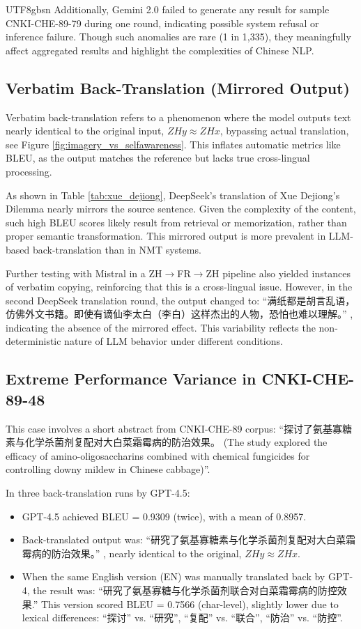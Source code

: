 \documentclass[conference]{IEEEtran}
\begin{document}
\begin{CJK}{UTF8}{gbsn}
Additionally, Gemini 2.0 failed to generate any result for sample CNKI-CHE-89-79 during one round, indicating possible system refusal or inference failure. Though such anomalies are rare (1 in 1,335), they meaningfully affect aggregated results and highlight the complexities of Chinese NLP.

\subsection{Verbatim Back-Translation (Mirrored Output)}
Verbatim back-translation refers to a phenomenon where the model outputs text nearly identical to the original input, $ZHy \approx ZHx$, bypassing actual translation, see Figure \ref{fig:imagery_vs_selfawareness}. This inflates automatic metrics like BLEU, as the output matches the reference but lacks true cross-lingual processing.

As shown in Table \ref{tab:xue_dejiong}, DeepSeek’s translation of Xue Dejiong’s Dilemma nearly mirrors the source sentence. Given the complexity of the content, such high BLEU scores likely result from retrieval or memorization, rather than proper semantic transformation. This mirrored output is more prevalent in LLM-based back-translation than in NMT systems.

Further testing with Mistral in a ZH$\rightarrow$FR$\rightarrow$ZH pipeline also yielded instances of verbatim copying, reinforcing that this is a cross-lingual issue. However, in the second DeepSeek translation round, the output changed to:
``满纸都是胡言乱语，仿佛外文书籍。即使有谪仙李太白（李白）这样杰出的人物，恐怕也难以理解。''
, indicating the absence of the mirrored effect. This variability reflects the non-deterministic nature of LLM behavior under different conditions.

\subsection{Extreme Performance Variance in CNKI-CHE-89-48}
This case involves a short abstract \citep{ma2024cfm} from CNKI-CHE-89 corpus:
``探讨了氨基寡糖素与化学杀菌剂复配对大白菜霜霉病的防治效果。
(The study explored the efficacy of amino-oligosaccharins combined with chemical fungicides for controlling downy mildew in Chinese cabbage)''.

In three back-translation runs by GPT-4.5:
\begin{itemize}
    
\item GPT-4.5 achieved BLEU = 0.9309 (twice), with a mean of 0.8957. %
\item Back-translated output was:
``研究了氨基寡糖素与化学杀菌剂复配对大白菜霜霉病的防治效果。'' ,  nearly identical to the original, $ZHy \approx ZHx$.
\item When the same English version (EN) was manually translated back by GPT-4, the result was:
``研究了氨基寡糖与化学杀菌剂联合对白菜霜霉病的防控效果.''
This version scored BLEU = 0.7566 (char-level), slightly lower due to lexical differences:
``探讨'' vs. ``研究'', ``复配'' vs. ``联合'', ``防治'' vs. ``防控''.
 

\end{itemize}
\end{CJK}
\end{document}

